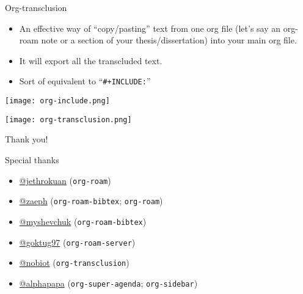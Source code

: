 \documentclass[presentation,xcolor=table]{beamer}
\begin{document}
\begin{frame}{Org-transclusion}
 \begin{itemize}
\item An effective way of ``copy/pasting'' text from one org file (let's say an org-roam note or a section of your thesis/dissertation) into your main org file.
\item It will export all the transcluded text.
\item Sort of equivalent to ``\texttt{\#+INCLUDE:}''
\end{itemize}

\begin{center}
\texttt{[image: org-include.png]}
\end{center}

\begin{center}
\texttt{[image: org-transclusion.png]}
\end{center}
\end{frame}

\begin{frame}[label={sec:org6855e8b},fragile]{Thank you!}
 \begin{block}{Special thanks}
\begin{itemize}
\item \href{https://github.com/jethrokuan}{@jethrokuan} (\texttt{org-roam})
\item \href{https://github.com/zaeph}{@zaeph} (\texttt{org-roam-bibtex}; \texttt{org-roam})
\item \href{https://github.com/myshevchuk}{@myshevchuk} (\texttt{org-roam-bibtex})
\item \href{https://github.com/goktug97}{@goktug97} (\texttt{org-roam-server})
\item \href{https://github.com/nobiot}{@nobiot} (\texttt{org-transclusion})
\item \href{https://github.com/alphapapa}{@alphapapa} (\texttt{org-super-agenda}; \texttt{org-sidebar})
\end{itemize}
\end{block}
\end{frame}
\end{document}
